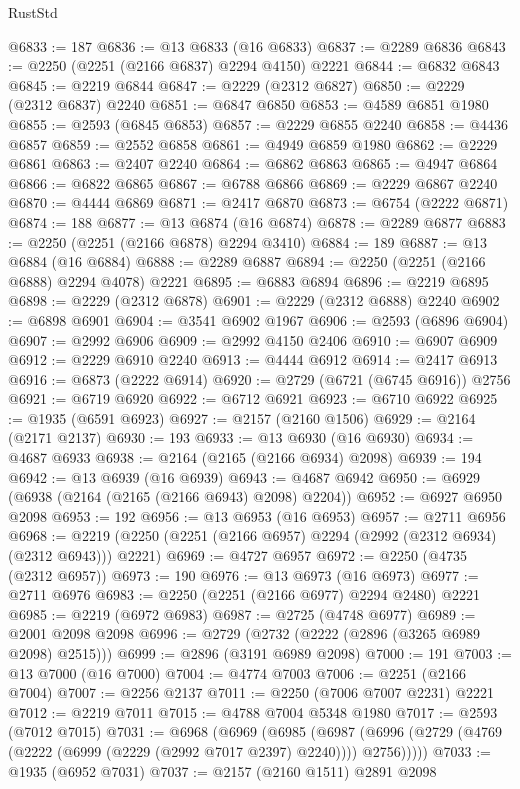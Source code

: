 \begin{lexlean}{RustStd}
\begin{coremodule}
{\begin{coremodule}
{{{{{{{{{{{{{{{{{{{{{{{{{{{{{{{{{{{{{{{{{{{{{{{{{{{{{@6833 := 187
@6836 := @13 @6833 (@16 @6833)
@6837 := @2289 @6836
@6843 := @2250 (@2251 (@2166 @6837) @2294 @4150) @2221
@6844 := @6832 @6843
@6845 := @2219 @6844
@6847 := @2229 (@2312 @6827)
@6850 := @2229 (@2312 @6837) @2240
@6851 := @6847 @6850
@6853 := @4589 @6851 @1980
@6855 := @2593 (@6845 @6853)
@6857 := @2229 @6855 @2240
@6858 := @4436 @6857
@6859 := @2552 @6858
@6861 := @4949 @6859 @1980
@6862 := @2229 @6861
@6863 := @2407 @2240
@6864 := @6862 @6863
@6865 := @4947 @6864
@6866 := @6822 @6865
@6867 := @6788 @6866
@6869 := @2229 @6867 @2240
@6870 := @4444 @6869
@6871 := @2417 @6870
@6873 := @6754 (@2222 @6871)
@6874 := 188
@6877 := @13 @6874 (@16 @6874)
@6878 := @2289 @6877
@6883 := @2250 (@2251 (@2166 @6878) @2294 @3410)
@6884 := 189
@6887 := @13 @6884 (@16 @6884)
@6888 := @2289 @6887
@6894 := @2250 (@2251 (@2166 @6888) @2294 @4078) @2221
@6895 := @6883 @6894
@6896 := @2219 @6895
@6898 := @2229 (@2312 @6878)
@6901 := @2229 (@2312 @6888) @2240
@6902 := @6898 @6901
@6904 := @3541 @6902 @1967
@6906 := @2593 (@6896 @6904)
@6907 := @2992 @6906
@6909 := @2992 @4150 @2406
@6910 := @6907 @6909
@6912 := @2229 @6910 @2240
@6913 := @4444 @6912
@6914 := @2417 @6913
@6916 := @6873 (@2222 @6914)
@6920 := @2729 (@6721 (@6745 @6916)) @2756
@6921 := @6719 @6920
@6922 := @6712 @6921
@6923 := @6710 @6922
@6925 := @1935 (@6591 @6923)
@6927 := @2157 (@2160 @1506)
@6929 := @2164 (@2171 @2137)
@6930 := 193
@6933 := @13 @6930 (@16 @6930)
@6934 := @4687 @6933
@6938 := @2164 (@2165 (@2166 @6934) @2098)
@6939 := 194
@6942 := @13 @6939 (@16 @6939)
@6943 := @4687 @6942
@6950 := @6929 (@6938 (@2164 (@2165 (@2166 @6943) @2098) @2204))
@6952 := @6927 @6950 @2098
@6953 := 192
@6956 := @13 @6953 (@16 @6953)
@6957 := @2711 @6956
@6968 := @2219 (@2250 (@2251 (@2166 @6957) @2294 (@2992 (@2312 @6934) (@2312 @6943))) @2221)
@6969 := @4727 @6957
@6972 := @2250 (@4735 (@2312 @6957))
@6973 := 190
@6976 := @13 @6973 (@16 @6973)
@6977 := @2711 @6976
@6983 := @2250 (@2251 (@2166 @6977) @2294 @2480) @2221
@6985 := @2219 (@6972 @6983)
@6987 := @2725 (@4748 @6977)
@6989 := @2001 @2098 @2098
@6996 := @2729 (@2732 (@2222 (@2896 (@3265 @6989 @2098) @2515)))
@6999 := @2896 (@3191 @6989 @2098)
@7000 := 191
@7003 := @13 @7000 (@16 @7000)
@7004 := @4774 @7003
@7006 := @2251 (@2166 @7004)
@7007 := @2256 @2137
@7011 := @2250 (@7006 @7007 @2231) @2221
@7012 := @2219 @7011
@7015 := @4788 @7004 @5348 @1980
@7017 := @2593 (@7012 @7015)
@7031 := @6968
    (@6969
      (@6985
        (@6987 (@6996 (@2729 (@4769 (@2222 (@6999 (@2229 (@2992 @7017 @2397) @2240)))) @2756)))))
@7033 := @1935 (@6952 @7031)
@7037 := @2157 (@2160 @1511) @2891 @2098
}}}}}}}}}}}}}}}}}}}}}}}}}}}}}}}}}}}}}}}}}}}}}}}}}}}}}
\end{coremodule}}
\end{coremodule}
\end{lexlean}
